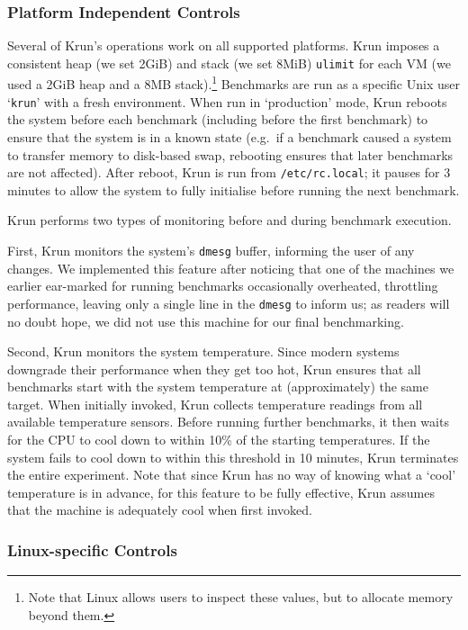 \documentclass[10pt,preprint]{sigplanconf}
\newcommand{\krun}{Krun\xspace}
\begin{document}
\subsubsection{Platform Independent Controls}

Several of \krun's operations work on all supported platforms. \krun imposes a
consistent heap (we set 2GiB) and stack (we set 8MiB) \texttt{ulimit} for each
VM (we used a 2GiB heap and a 8MB stack).\footnote{Note that Linux allows users
to inspect these values, but to allocate memory beyond them.} Benchmarks are run
as a specific Unix user `\texttt{krun}' with a fresh environment. When run in
`production' mode, \krun reboots the system before each benchmark (including
before the first benchmark) to ensure that the system is in a known state
(e.g.~if a benchmark caused a system to transfer memory to disk-based swap,
rebooting ensures that later benchmarks are not affected). After reboot, \krun
is run from \texttt{/etc/rc.local}; it pauses for 3 minutes to allow the system
to fully initialise before running the next benchmark.

\krun performs two types of monitoring before and during benchmark execution.

First, \krun monitors the system's \texttt{dmesg} buffer, informing the user of
any changes. We implemented this feature after noticing that one of the
machines we
earlier ear-marked for running benchmarks occasionally overheated, throttling
performance, leaving only a single line in the \texttt{dmesg} to inform us; as
readers will no doubt hope, we did not use this machine for our final
benchmarking.

Second, \krun monitors the system temperature. Since modern systems downgrade
their performance when they get too hot, \krun ensures that all benchmarks
start with the system temperature at (approximately) the same target. When
initially invoked, \krun collects temperature readings from all available
temperature sensors. Before running
further benchmarks, it then waits for the CPU to cool down to within 10\%{} of
the starting temperatures. If the system fails to cool down to within
this threshold in 10 minutes, \krun terminates the entire experiment. Note that
since \krun has no way of knowing what a `cool' temperature is in advance, for
this feature to be fully effective, \krun assumes that the machine is adequately
cool when first invoked.


\subsubsection{Linux-specific Controls}
\end{document}
